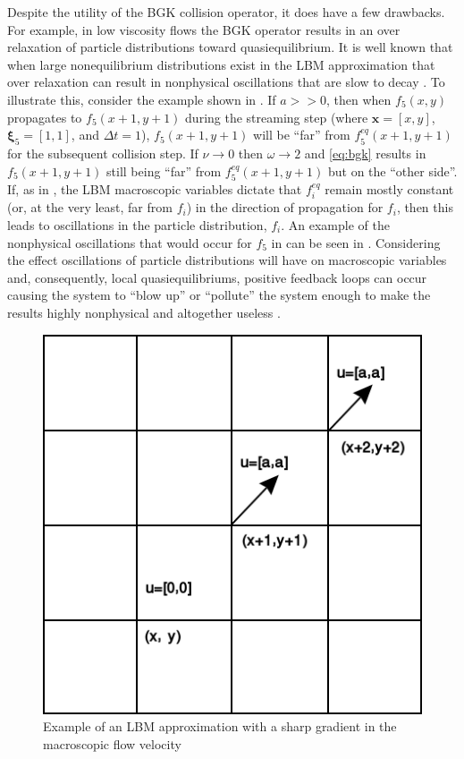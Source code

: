 \documentclass[pdftex,ms]{pittetd}
\newcommand{\pos}{\mathbf{x}}
\newcommand{\pvel}{\boldsymbol{\xi}}
\begin{document}
Despite the utility of the BGK collision operator, it does have a few drawbacks.
For example, in low viscosity flows the BGK operator results in an over relaxation of particle distributions toward quasiequilibrium.
It is well known that when large nonequilibrium distributions exist in the LBM approximation that over relaxation can result in nonphysical oscillations that are slow to decay \cite{brownlee2007stability,dellar2003incompressible}.
To illustrate this, consider the example shown in .
If $a >> 0$, then when $f_5(x,y)$ propagates to $f_5(x+1,y+1)$ during the streaming step (where $\pos = [x,y]$, $\pvel_5 = [1,1]$, and $\Delta t = 1$), $f_5(x+1,y+1)$ will be ``far'' from $f^{eq}_5(x+1,y+1)$ for the subsequent collision step.
If $\nu \rightarrow 0$ then $\omega \rightarrow 2$ and \eqref{eq:bgk} results in $f_5(x+1,y+1)$ still being ``far'' from $f^{eq}_5(x+1,y+1)$ but on the ``other side''.
If, as in , the LBM macroscopic variables dictate that $f^{eq}_i$ remain mostly constant (or, at the very least, far from $f_i$) in the direction of propagation for $f_i$, then this leads to oscillations in the particle distribution, $f_i$.
An example of the nonphysical oscillations that would occur for $f_5$ in  can be seen in .
Considering the effect oscillations of particle distributions will have on macroscopic variables and, consequently, local quasiequilibriums, positive feedback loops can occur causing the system to ``blow up'' or ``pollute'' the system enough to make the results highly nonphysical and altogether useless \cite{gorban2014enhancement}.

\begin{figure}
	\centering
    \includegraphics[width=\linewidth]{figs/sharp_gradient}
    \caption{Example of an LBM approximation with a sharp gradient in the macroscopic flow velocity}
    \label{fig:sharp-grad}
\end{figure}
\end{document}
